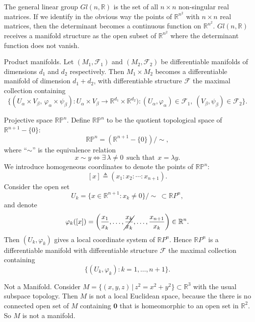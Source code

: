 \begin{examples}
\begin{enumerate}
		 The general linear group $Gl(n,\mathbb{R})$ is the set of
		all $n\times n$ non-singular real matrices. If we identify
		in the obvious way the points of $\mathbb{R}^{n^{2}}$ with
		$n\times n$ real matrices, then the determinant becomes a
		continuous function on $\mathbb{R}^{n^{2}}$. $Gl(n,\mathbb{R})$
		receives a manifold structure as the open subset of
		$\mathbb{R}^{n^{2}}$ where the determinant function does not
		vanish. 

		 Product manifolds. Let $(M_{1},\mathcal{F}_{1})$
		and $(M_{2},\mathcal{F}_{2})$ be differentiable
		manifolds of dimensions $d_{1}$ and $d_{2}$ respectively.
		Then $M_{1}\times M_{2}$ becomes a differentiable manifold of
		dimension $d_{1}+d_{2}$, with differentiable structure
		$\mathcal{F}$ the maximal collection containing
		\[
			\{(U_{\alpha}\times V_{\beta},\,\varphi_{\alpha}\times\psi_{\beta})\colon U_{\alpha}\times V_{\beta}\to\mathbb{R}^{d_{1}}\times\mathbb{R}^{d_{2}})\colon(U_{\alpha},\varphi_{\alpha})\in\mathcal{F}_{1},\ (V_{\beta},\psi_{\beta})\in\mathcal{F}_{2}\}.
		\]

		 Projective space $\mathbb{RP}^{n}$. 
		Define $\mathbb{RP}^{n}$ to be the quotient topological space of
		$\mathbb{R}^{n+1}-\{0\}$:
		\[
			\mathbb{RP}^{n}=(\mathbb{R}^{n+1}-\{0\})/{\sim},
		\]
		where ``$\sim$'' is the equivalence relation
		\[
			x\sim y\iff\exists\,\lambda\neq0\ \ \text{such that}\ \ x=\lambda y.
		\]
		We introduce homogeneous coordinates to denote the points of
		$\mathbb{RP}^{n}$:
		\[
			[x]\triangleq(x_{1}\colon x_{2}\colon\cdots\colon x_{n+1}).
		\]
		Consider the open set
		\[
			U_{k}=\{x\in\mathbb{R}^{n+1}\colon x_{k}\neq0\}/{\sim}\ \subset\mathbb{R}P^{n},
		\]
		and denote
		\[
			\varphi_{k}([x])=\left(\frac{x_{1}}{x_{k}},\ldots,\cancel{\frac{x_{k}}{x_{k}}},\ldots,\frac{x_{n+1}}{x_{k}}\right)\in\mathbb{R}^{n}.
		\]
		Then $(U_{k},\varphi_{k})$ gives a local coordinate system of $\mathbb{R}P^{n}$.
		Hence $\mathbb{R}P^{n}$ is a differentiable manifold with differentiable
		structure $\mathcal{F}$ the maximal collection containing
		\[
			\{(U_{k},\varphi_{k})\colon k=1,\ldots,n+1\}.
		\]

		 Not a Manifold. Consider $M = \{(x,y,z)\,|\, z^2=x^2+y^2\}\subset\mathbb{R}^3$
		with the usual subspace topology. Then $M$ is not a local Euclidean
		space, because the there is no connected open set of $M$ containing $\mathbf{0}$
		that is homeomorphic to an open set in $\mathbb{R}^2$. So $M$ is not a manifold.
	\end{enumerate}
\end{examples}

